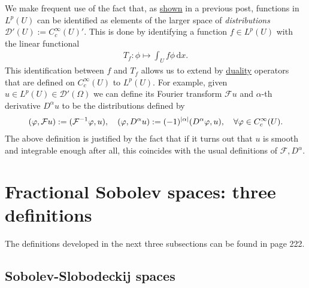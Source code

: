 \documentclass[
    a4paper,
    DIV=14,
    abstract=true,
    numbers=noenddot
]
{scrartcl}
\theoremstyle{definition}
\renewcommand{\d}{\,\mathrm{d}}\newcommand{\dx}{\,\mathrm{d}x}
\newcommand{\Dd}{\mathcal{D}}
\newcommand{\Ff}{\mathcal{F}}
\begin{document}
We make frequent use of the fact that, as \href{https://nowheredifferentiable.com/2023-07-12-PDEs-3-Sobolev_spaces/#:~:text=we%20would%20like%20to%20see%20what%20some%20of%20them%20look%20like.}{shown} in a previous post, functions in $L^p(U)$ can be identified as elements of the larger space of \emph{distributions} $\Dd '(U ):= C_c^\infty(U)'$. This is done by identifying a function $f \in L^p(U)$ with the linear functional 
\begin{align*}
    T_f:\phi \mapsto \int_U f\phi \d x.
\end{align*}
This identification between $f$ and $T_f$  allows us to extend by \href{https://nowheredifferentiable.com/2023-01-29-PDE-1-Fourier/#:~:text=is%20called%20the-,duality,-method%20and%20appears}{duality} operators that are defined on $C_c^\infty(U)$ to $L^p(U)$. For example, given $u \in L^p(U) \in \Dd'(\Omega )$ we can define its Fourier transform $\Ff u$  and  $\alpha$-th derivative $D^\alpha u$  to be the distributions defined by
\begin{align*}
    (\varphi ,\Ff u):=(\Ff^{-1}\varphi ,u),\quad (\varphi ,D^\alpha u):=(-1)^{\abs{\alpha}}(D^\alpha \varphi ,u), \quad \forall \varphi \in C_c^\infty(U).
\end{align*}
The above definition is justified by the fact that if it turns out that $u$ is smooth and integrable enough after all, this coincides with the usual definitions of $\Ff, D^\alpha$.



\section{Fractional Sobolev spaces: three definitions}
The definitions developed in the next three subsections can be found in \cite{agranovich2015sobolev} page 222.
\subsection{Sobolev-Slobodeckij spaces}
\end{document}
